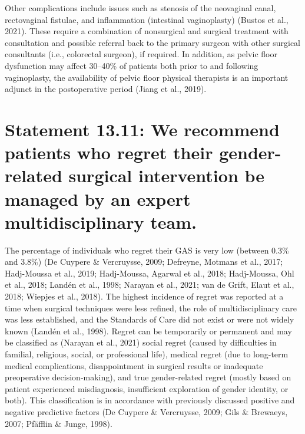 \documentclass[
]{book}
\begin{document}
Other complications include issues such as stenosis of the neovaginal canal, rectovaginal fistulae, and inflammation (intestinal vaginoplasty)
(Bustos et al., 2021). These require a combination
of nonsurgical and surgical treatment with consultation and possible referral back to the primary surgeon with other surgical consultants (i.e.,
colorectal surgeon), if required. In addition, as
pelvic floor dysfunction may affect 30--40\% of
patients both prior to and following vaginoplasty,
the availability of pelvic floor physical therapists
is an important adjunct in the postoperative
period (Jiang et al., 2019).

\hypertarget{statement-13.11-we-recommend-patients-who-regret-their-gender-related-surgical-intervention-be-managed-by-an-expert-multidisciplinary-team.}{%
\section*{Statement 13.11: We recommend patients who regret their gender-related surgical intervention be managed by an expert multidisciplinary team.}\label{statement-13.11-we-recommend-patients-who-regret-their-gender-related-surgical-intervention-be-managed-by-an-expert-multidisciplinary-team.}}

The percentage of individuals who regret their
GAS is very low (between 0.3\% and 3.8\%) (De
Cuypere \& Vercruysse, 2009; Defreyne, Motmans
et al., 2017; Hadj-Moussa et al., 2019;
Hadj-Moussa, Agarwal et al., 2018; Hadj-Moussa,
Ohl et al., 2018; Landén et al., 1998; Narayan
et al., 2021; van de Grift, Elaut et al., 2018;
Wiepjes et al., 2018). The highest incidence of
regret was reported at a time when surgical techniques were less refined, the role of multidisciplinary care was less established, and the
Standards of Care did not exist or were not
widely known (Landén et al., 1998). Regret can
be temporarily or permanent and may be classified as (Narayan et al., 2021) social regret (caused
by difficulties in familial, religious, social, or professional life), medical regret (due to long-term
medical complications, disappointment in surgical
results or inadequate preoperative
decision-making), and true gender-related regret
(mostly based on patient experienced misdiagnosis, insufficient exploration of gender identity, or
both). This classification is in accordance with
previously discussed positive and negative
predictive factors (De Cuypere \& Vercruysse,
2009; Gils \& Brewaeys, 2007; Pfäfflin \&
Junge, 1998).
\end{document}
